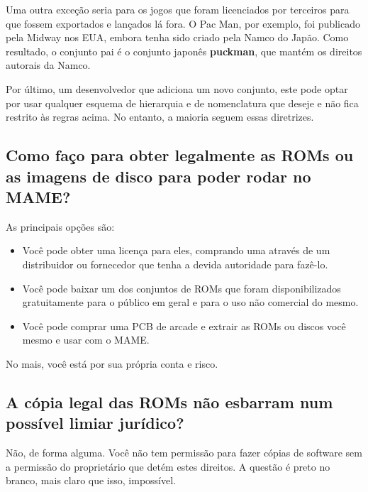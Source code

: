 \documentclass[letterpaper,10pt,brazil]{sphinxmanual}
\begin{document}
Uma outra exceção seria para os jogos que foram licenciados por
terceiros para que fossem exportados e lançados lá fora.
O Pac Man, por exemplo, foi publicado pela Midway nos EUA, embora tenha
sido criado pela Namco do Japão. Como resultado, o conjunto pai é o
conjunto japonês \textbf{puckman}, que mantém os direitos autorais da Namco.

Por último, um desenvolvedor que adiciona um novo conjunto, este pode
optar por usar qualquer esquema de hierarquia e de nomenclatura que
deseje e não fica restrito às regras acima.
No entanto, a maioria seguem essas diretrizes.


\subsection{Como faço para obter legalmente as ROMs ou as imagens de disco para poder rodar no MAME?}
\label{usingmame/commonissues:como-faco-para-obter-legalmente-as-roms-ou-as-imagens-de-disco-para-poder-rodar-no-mame}\label{usingmame/commonissues:legal-roms}
As principais opções são:
\begin{itemize}
\item {} 
Você pode obter uma licença para eles, comprando uma através de um
distribuidor ou fornecedor que tenha a devida autoridade para fazê-lo.

\item {} 
Você pode baixar um dos conjuntos de ROMs que foram disponibilizados
gratuitamente para o público em geral e para o uso não comercial do
mesmo.

\item {} 
Você pode comprar uma PCB de arcade e extrair as ROMs ou discos você
mesmo e usar com o MAME.

\end{itemize}

No mais, você está por sua própria conta e risco.


\subsection{A cópia legal das ROMs não esbarram num possível limiar jurídico?}
\label{usingmame/commonissues:a-copia-legal-das-roms-nao-esbarram-num-possivel-limiar-juridico}\label{usingmame/commonissues:roms-grey}
Não, de forma alguma.
Você não tem permissão para fazer cópias de software sem a permissão do
proprietário que detém estes direitos. A questão é preto no branco,
mais claro que isso, impossível.
\end{document}
